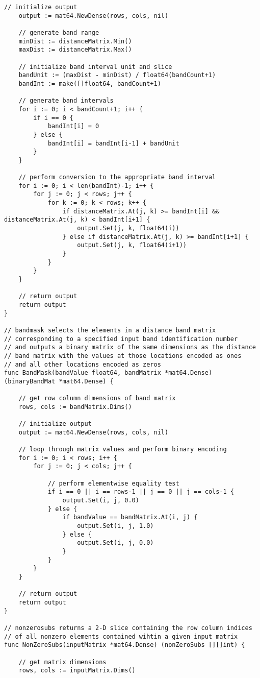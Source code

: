 \begin{lstlisting}[basicstyle=\tiny]
	// initialize output
	output := mat64.NewDense(rows, cols, nil)

	// generate band range
	minDist := distanceMatrix.Min()
	maxDist := distanceMatrix.Max()

	// initialize band interval unit and slice
	bandUnit := (maxDist - minDist) / float64(bandCount+1)
	bandInt := make([]float64, bandCount+1)

	// generate band intervals
	for i := 0; i < bandCount+1; i++ {
		if i == 0 {
			bandInt[i] = 0
		} else {
			bandInt[i] = bandInt[i-1] + bandUnit
		}
	}

	// perform conversion to the appropriate band interval
	for i := 0; i < len(bandInt)-1; i++ {
		for j := 0; j < rows; j++ {
			for k := 0; k < rows; k++ {
				if distanceMatrix.At(j, k) >= bandInt[i] && distanceMatrix.At(j, k) < bandInt[i+1] {
					output.Set(j, k, float64(i))
				} else if distanceMatrix.At(j, k) >= bandInt[i+1] {
					output.Set(j, k, float64(i+1))
				}
			}
		}
	}

	// return output
	return output
}

// bandmask selects the elements in a distance band matrix
// corresponding to a specified input band identification number
// and outputs a binary matrix of the same dimensions as the distance
// band matrix with the values at those locations encoded as ones
// and all other locations encoded as zeros
func BandMask(bandValue float64, bandMatrix *mat64.Dense) (binaryBandMat *mat64.Dense) {

	// get row column dimensions of band matrix
	rows, cols := bandMatrix.Dims()

	// initialize output
	output := mat64.NewDense(rows, cols, nil)

	// loop through matrix values and perform binary encoding
	for i := 0; i < rows; i++ {
		for j := 0; j < cols; j++ {

			// perform elementwise equality test
			if i == 0 || i == rows-1 || j == 0 || j == cols-1 {
				output.Set(i, j, 0.0)
			} else {
				if bandValue == bandMatrix.At(i, j) {
					output.Set(i, j, 1.0)
				} else {
					output.Set(i, j, 0.0)
				}
			}
		}
	}

	// return output
	return output
}

// nonzerosubs returns a 2-D slice containing the row column indices
// of all nonzero elements contained wihtin a given input matrix
func NonZeroSubs(inputMatrix *mat64.Dense) (nonZeroSubs [][]int) {

	// get matrix dimensions
	rows, cols := inputMatrix.Dims()


\end{lstlisting}
